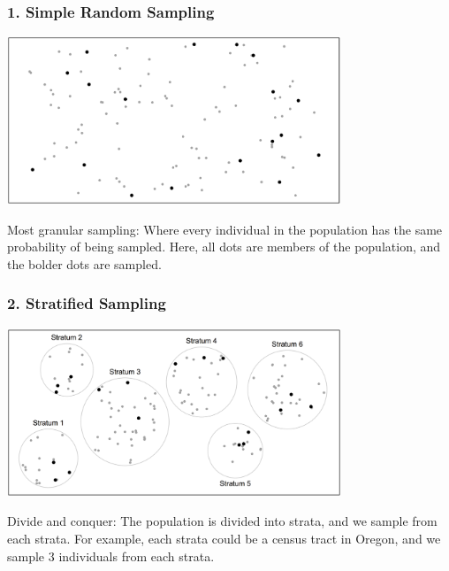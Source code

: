 \documentclass[handout]{beamer}
\newcommand{\blue}[1]{\textcolor{blue2}{#1}}
\begin{document}
\begin{frame}
\frametitle{1. Simple Random Sampling}

%
%
\begin{center}
\includegraphics[width=0.75\textwidth]{figure/simple.png}
\end{center}


\blue{Most granular sampling}:  Where every individual in the population has the same probability of being sampled.  Here, all dots are members of the population, and the bolder dots are sampled.  
\end{frame}


\begin{frame}[fragile]
\frametitle{2. Stratified Sampling}

%
%
\begin{center}
\includegraphics[width=0.75\textwidth]{figure/stratified.png}
\end{center}

\blue{Divide and conquer}:  The population is divided into strata, and we sample from each strata.  For example, each strata could be a census tract in Oregon, and we sample 3 individuals from each strata.  

\end{frame}
\end{document}
